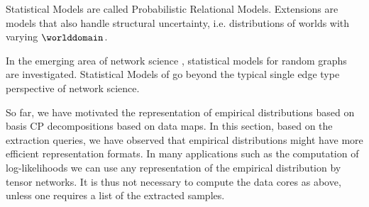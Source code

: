 




Statistical Models are called Probabilistic Relational Models. %
Extensions are models that also handle structural uncertainty, i.e. distributions of worlds with varying $\worlddomain$.

In the emerging area of network science \cite{barabasi_network_2016, giovanni_russo_vito_latora_complex_2017}, statistical models for random graphs are investigated.
Statistical Models of \firstOrderLogic{} go beyond the typical single edge type perspective of network science.


%
\begin{remark}
    So far, we have motivated the representation of empirical distributions based on basis CP decompositions based on data maps.
    In this section, based on the extraction queries, we have observed that empirical distributions might have more efficient representation formats.
    In many applications such as the computation of log-likelihoods we can use any representation of the empirical distribution by tensor networks.
    It is thus not necessary to compute the data cores as above, unless one requires a list of the extracted samples.
\end{remark}